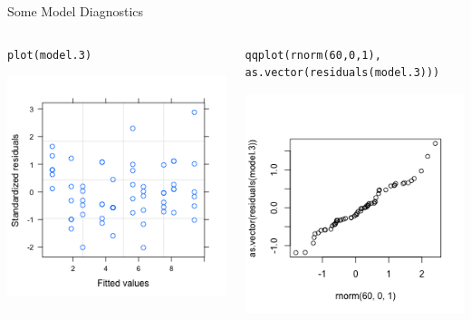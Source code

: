 \documentclass{beamer}
\begin{document}
\begin{frame}[fragile]{Some Model Diagnostics}
\small
    \begin{columns}
    \begin{column}{0.5\textwidth}
          \begin{verbatim}
plot(model.3)
          \end{verbatim}
    \includegraphics[width=\textwidth]{lectures/day_4_GLS/figures/unnamed-chunk-47-1.png}
    \end{column}
    \begin{column}{0.5\textwidth}
    \begin{verbatim}
qqplot(rnorm(60,0,1), 
as.vector(residuals(model.3)))
    \end{verbatim}
    \includegraphics[width=\textwidth]{lectures/day_4_GLS/figures/unnamed-chunk-48-1.png}
         

\end{column}
\end{columns}
\end{frame}
\end{document}
